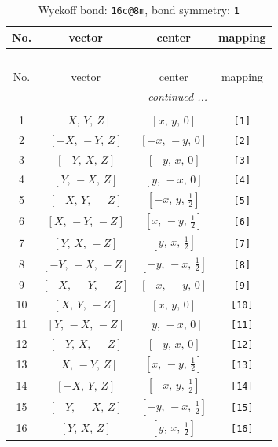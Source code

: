 \documentclass[fleqn,8pt]{jsarticle}
\begin{document}
\begin{longtable}{cccc}
\caption{Wyckoff bond: {\tt 16c@8m}, bond symmetry: {\tt 1}}
 \\
 \hline \hline
No. & vector & center & mapping \\ \hline \endfirsthead

\multicolumn{3}{l}{\tablename\ \thetable{}} \\
 \hline \hline
No. & vector & center & mapping \\ \hline \endhead

 \hline \hline
\multicolumn{3}{r}{\footnotesize\it continued ...} \\ \endfoot

 \hline \hline
\multicolumn{3}{r}{} \\ \endlastfoot

1 & $\left[ X,\, Y,\, Z \right]$ & $\left[ x,\, y,\, 0 \right]$ & {\tt [1]} \\ \hline
2 & $\left[ - X,\, - Y,\, Z \right]$ & $\left[ - x,\, - y,\, 0 \right]$ & {\tt [2]} \\ \hline
3 & $\left[ - Y,\, X,\, Z \right]$ & $\left[ - y,\, x,\, 0 \right]$ & {\tt [3]} \\ \hline
4 & $\left[ Y,\, - X,\, Z \right]$ & $\left[ y,\, - x,\, 0 \right]$ & {\tt [4]} \\ \hline
5 & $\left[ - X,\, Y,\, - Z \right]$ & $\left[ - x,\, y,\, \frac{1}{2} \right]$ & {\tt [5]} \\ \hline
6 & $\left[ X,\, - Y,\, - Z \right]$ & $\left[ x,\, - y,\, \frac{1}{2} \right]$ & {\tt [6]} \\ \hline
7 & $\left[ Y,\, X,\, - Z \right]$ & $\left[ y,\, x,\, \frac{1}{2} \right]$ & {\tt [7]} \\ \hline
8 & $\left[ - Y,\, - X,\, - Z \right]$ & $\left[ - y,\, - x,\, \frac{1}{2} \right]$ & {\tt [8]} \\ \hline
9 & $\left[ - X,\, - Y,\, - Z \right]$ & $\left[ - x,\, - y,\, 0 \right]$ & {\tt [9]} \\ \hline
10 & $\left[ X,\, Y,\, - Z \right]$ & $\left[ x,\, y,\, 0 \right]$ & {\tt [10]} \\ \hline
11 & $\left[ Y,\, - X,\, - Z \right]$ & $\left[ y,\, - x,\, 0 \right]$ & {\tt [11]} \\ \hline
12 & $\left[ - Y,\, X,\, - Z \right]$ & $\left[ - y,\, x,\, 0 \right]$ & {\tt [12]} \\ \hline
13 & $\left[ X,\, - Y,\, Z \right]$ & $\left[ x,\, - y,\, \frac{1}{2} \right]$ & {\tt [13]} \\ \hline
14 & $\left[ - X,\, Y,\, Z \right]$ & $\left[ - x,\, y,\, \frac{1}{2} \right]$ & {\tt [14]} \\ \hline
15 & $\left[ - Y,\, - X,\, Z \right]$ & $\left[ - y,\, - x,\, \frac{1}{2} \right]$ & {\tt [15]} \\ \hline
16 & $\left[ Y,\, X,\, Z \right]$ & $\left[ y,\, x,\, \frac{1}{2} \right]$ & {\tt [16]} \\
\end{longtable}
\end{document}
